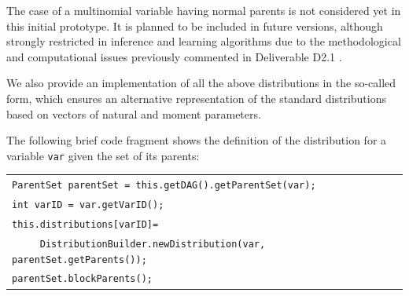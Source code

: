 The case of a multinomial variable having normal parents is not considered yet in this initial prototype. It is planned to be included in future versions, although strongly restricted in inference and learning algorithms due to the methodological and computational issues previously commented in Deliverable D2.1 \cite{Deliverable2.1}. 

We also provide an implementation of all the above distributions in the so-called  form, which ensures an alternative representation of the standard distributions based on vectors of natural and moment parameters.

The following brief code fragment shows the definition of the distribution for a variable \texttt{var} given the set of its parents:

\begin{table}[H]
\begin{tabular}{l} \hline

        \texttt{ParentSet parentSet = this.getDAG().getParentSet(var);}\\
        \texttt{int varID = var.getVarID();}\\

        \texttt{this.distributions[varID]= }\\
         \texttt{~~~~~DistributionBuilder.newDistribution(var, parentSet.getParents());}\\
        \texttt{parentSet.blockParents();}\\ \hline 

\end{tabular}
\end{table}
